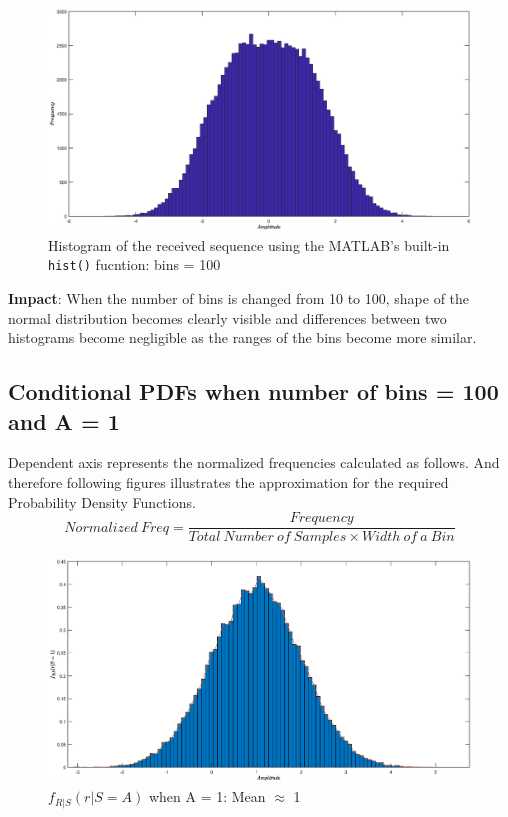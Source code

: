\documentclass[a4paper,11pt]{article}%
\begin{document}
\begin{figure}[!h]
	\centering
	\includegraphics[scale=0.45]{figures/q5f5}
	\caption{Histogram of the received sequence using the MATLAB's built-in {\tt hist()} fucntion: bins = 100}
\end{figure}
\textbf{Impact}: When the number of bins is changed from 10 to 100, shape of the normal distribution becomes clearly visible and differences between two histograms become negligible as the ranges of the bins become more similar.

\pagebreak
\subsection{Conditional PDFs when number of bins = 100 and A = 1}

Dependent axis represents the normalized frequencies calculated as follows. And therefore following figures illustrates the approximation for the required Probability Density Functions.
\[
Normalized ~Freq = \frac{Frequency}{Total~Number~of~Samples \times Width~of~a~Bin}
\] 

\begin{figure}[!h]
	\centering
	\includegraphics[scale=0.45]{figures/q5f6}
	\caption{$f_{R|S}(r|S=A)$ when A = 1: Mean $\approx$ 1}
\end{figure}
\end{document}
